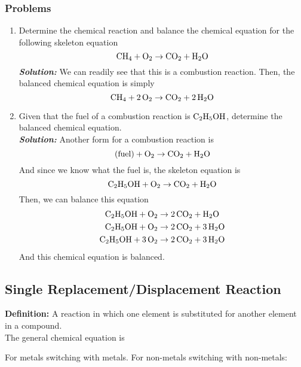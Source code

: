 \documentclass[12pt]{report}
\begin{document}
\subsubsection{Problems}
\begin{enumerate}
\setlength\itemsep{0.5em}
    \item{Determine the chemical reaction and balance the chemical equation for the following skeleton equation
            \[
                \ce{CH4}+ \ce{O2}\to \ce{CO2}+ \ce{H2O}
            \]
        }
    \textit{\textbf{Solution:}} We can readily see that this is a combustion reaction. Then, the balanced chemical equation is simply 
    \[
        \ce{CH4}+ \ce{2O2}\to \ce{CO2}+ \ce{2H2O}   
    \]

    \item{Given that the fuel of a combustion reaction is $ \ce{C2H5OH}$, determine the balanced chemical equation.}\\

        \textit{\textbf{Solution:}} Another form for a combustion reaction is 
        \[
            \text{(fuel)}+ \ce{O2}\to \ce{CO2}+ \ce{H2O}
        \]
        And since we know what the fuel is, the skeleton equation is 
        \[
            \ce{C2H5OH}+ \ce{O2}\to \ce{CO2}+ \ce{H2O}
        \]
        Then, we can balance this equation 
        \begin{align*}
            \ce{C2H5OH}+ \ce{O2}&\to \ce{2CO2}+ \ce{H2O}\\
            \ce{C2H5OH}+ \ce{O2}&\to \ce{2CO2}+ \ce{3H2O}\\
            \ce{C2H5OH}+ \ce{3O2}&\to \ce{2CO2}+ \ce{3H2O}
        \end{align*}
        And this chemical equation is balanced. 
\end{enumerate}

\subsection{Single Replacement/Displacement Reaction}
\textbf{Definition:} A reaction in which one element is substituted for another element in a compound.\\

The general chemical equation is 

\begin{center}
\end{center}
For metals switching with metals. For non-metals switching with non-metals: 
\begin{center}
\end{center}
\end{document}
